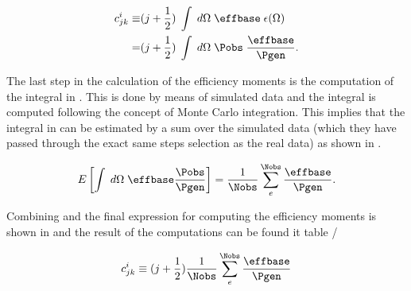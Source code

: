 \begin{center}
\begin{align}
   c^i_{jk}  \equiv &(j + \frac{1}{2}) \; \int \; d\Omega \; \effbase \; \epsilon(\Omega) \nonumber \\
                 = &(j + \frac{1}{2}) \; \int \; d\Omega \; \Pobs \; \frac{\effbase}{\Pgen}.
  \label{eff_moms_def}
\end{align}
\end{center}

\noindent The last step in the calculation of the efficiency moments is the computation of the integral in .
This is done by means of simulated data and the integral is computed following the concept of Monte Carlo integration. This implies
that the integral in  can be estimated by a sum over the simulated data (which they have passed through the exact
same steps selection as the real data) as shown in .

\begin{center}
\begin{equation}
  E\left[ \int \; d\Omega \; \effbase \frac{\Pobs}{\Pgen} \right] = \frac{1}{\Nobs} \sum_e^{\Nobs} \frac{\effbase}{\Pgen}.
  \label{eff_moms_calc}
\end{equation}
\end{center}

\noindent Combining  and  the final expression for computing the efficiency moments is shown
in  and the result of the computations can be found it table /

\begin{center}
\begin{equation}
 c^i_{jk} \equiv (j + \frac{1}{2})  \frac{1}{\Nobs} \sum_e^{\Nobs} \frac{\effbase}{\Pgen}
  \label{eff_moms_calc_final}
\end{equation}
\end{center}

